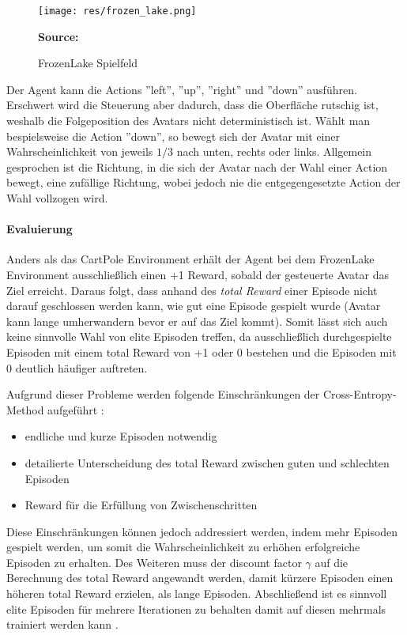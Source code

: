 \documentclass[11pt]{scrartcl}
\newcommand{\source}[1]{\vspace{-5pt} \caption*{\hfill \textbf{Source:} {#1}} }
\begin{document}
\begin{figure}[htp]
\centering
\texttt{[image: res/frozen\_lake.png]}
\caption{FrozenLake Spielfeld}
\source{\cite[~S.90 - Chapter 4 - Figure 5]{L2018}}
\label{fig:frozen_lake}
\end{figure}

\noindent
Der Agent kann die Actions ''left'', ''up'', ''right'' und ''down'' ausführen.
Erschwert wird die Steuerung aber dadurch, dass die Oberfläche rutschig ist, weshalb
die Folgeposition des Avatars nicht deterministisch ist. Wählt man bespielsweise die
Action ''down'', so bewegt sich der Avatar mit einer Wahrscheinlichkeit von jeweils
$1/3$ nach unten, rechts oder links. Allgemein gesprochen ist die Richtung, in die
sich der Avatar nach der Wahl einer Action bewegt, eine zufällige Richtung, wobei
jedoch nie die entgegengesetzte Action der Wahl vollzogen wird.


\paragraph*{Evaluierung}
\noindent
\newline
Anders als das CartPole Environment erhält der Agent bei dem FrozenLake Environment 
ausschließlich einen +1 Reward, sobald der gesteuerte Avatar das Ziel erreicht. Daraus folgt,
dass anhand des \textit{total Reward} einer Episode nicht darauf geschlossen werden kann,
wie gut eine Episode gespielt wurde (Avatar kann lange umherwandern bevor er auf das Ziel kommt).
Somit lässt sich auch keine sinnvolle Wahl von elite Episoden treffen, da ausschließlich
durchgespielte Episoden mit einem total Reward von +1 oder 0 bestehen und die Episoden mit 0
deutlich häufiger auftreten.

Aufgrund dieser Probleme werden folgende Einschränkungen der Cross-Entropy-Method 
aufgeführt \cite[~S.92 f.]{L2018}:
\begin{itemize}
\itemsep0pt
\item endliche und kurze Episoden notwendig
\item detailierte Unterscheidung des total Reward zwischen guten und schlechten Episoden
\item Reward für die Erfüllung von Zwischenschritten
  \label{itm:cross_entropy_limits}
\end{itemize}

Diese Einschränkungen können jedoch addressiert werden, indem mehr Episoden gespielt werden, 
um somit die Wahrscheinlichkeit zu erhöhen erfolgreiche Episoden zu erhalten. Des Weiteren
muss der discount factor $\gamma$ auf die Berechnung des total Reward angewandt werden, damit
kürzere Episoden einen höheren total Reward erzielen, als lange Episoden. Abschließend ist es
sinnvoll elite Episoden für mehrere Iterationen zu behalten damit auf diesen mehrmals
trainiert werden kann \cite[~S.93]{L2018}.  
\end{document}
